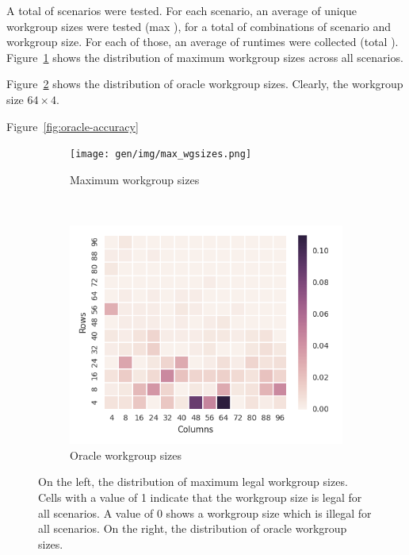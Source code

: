 A total of  scenarios were tested. For each
scenario, an average of  unique workgroup
sizes were tested (max ), for a total of
 combinations of scenario and workgroup
size. For each of those, an average of 
runtimes were collected (total
). Figure~\ref{fig:max-wgsizes} shows the
distribution of maximum workgroup sizes across all
scenarios.

Figure~\ref{fig:oracle-wgsizes} shows the distribution of oracle
workgroup sizes. Clearly, the workgroup size $64 \times 4$.

Figure~\ref{fig:oracle-accuracy}


\begin{figure}
\begin{subfigure}[t]{0.45\textwidth}
\centering
\texttt{[image: gen/img/max\_wgsizes.png]}
\vspace{-1.5em} %
\caption{Maximum workgroup sizes}
\label{fig:max-wgsizes}
\end{subfigure}
~
\begin{subfigure}[t]{0.45\textwidth}
\centering
\includegraphics{gen/img/oracle_param_space.png}
\vspace{-1.5em} %
\caption{Oracle workgroup sizes}
\label{fig:oracle-wgsizes}
\end{subfigure}
\caption{%
  On the left, the distribution of maximum legal workgroup
  sizes. Cells with a value of 1 indicate that the workgroup size is
  legal for all scenarios. A value of 0 shows a workgroup size which
  is illegal for all scenarios. On the right, the distribution of
  oracle workgroup sizes.%
}
\label{fig:heatmaps}
\end{figure}


